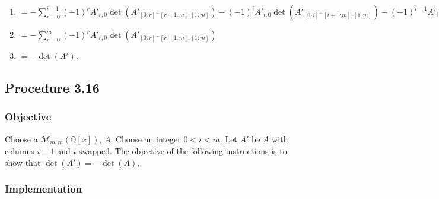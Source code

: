 \documentclass[twocolumn]{article}
\newcommand{\procedure}[2][]{\subsection*{Procedure #2 \ifthenelse{\equal{#1}{}}{}{(#1)}}\label{sec:procedure #2}}
\newcommand{\objective}{\subsubsection*{Objective}}
\newcommand{\implementation}{\subsubsection*{Implementation}}
\begin{document}
\begin{enumerate}
\begin{enumerate}
\begin{enumerate}
							\item $=-\sum_{r=0}^{i-1} (-1)^rA'_{r,0}\det(A'_{[0:r]^\frown[r+1:m],[1:m]})-(-1)^{i}A'_{i,0}\det(A'_{[0:i]^\frown[i+1:m],[1:m]})-(-1)^{i-1}A'_{i-1,0}\det(A'_{[0:i-1]^\frown[i:m],[1:m]})-\sum_{r=i+1}^m (-1)^rA'_{r,0}\det(A'_{[0:r]^\frown[r+1:m],[1:m]})$
							\item $=-\sum_{r=0}^m (-1)^rA'_{r,0}\det(A'_{[0:r]^\frown[r+1:m],[1:m]})$
							\item $=-\det(A')$.
						\end{enumerate}
					\end{enumerate}
				\end{enumerate}
		\procedure{3.16}
			\objective
				Choose a $\mathcal{M}_{m,m}(\mathbb{Q}[x])$, $A$. Choose an integer $0<i<m$. Let $A'$ be $A$ with columns $i-1$ and $i$ swapped. The objective of the following instructions is to show that $\det(A')=-\det(A)$.
			\implementation
\end{document}
